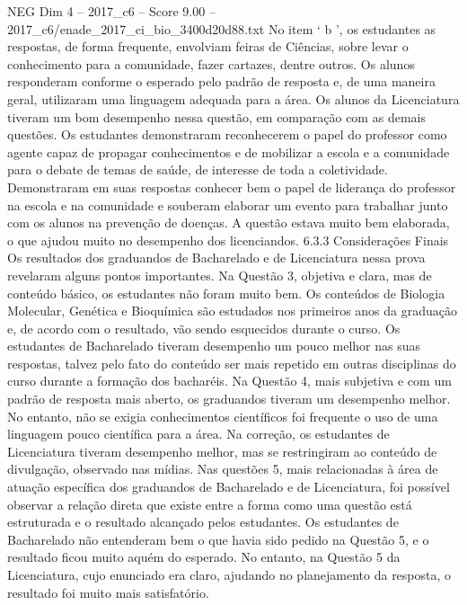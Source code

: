 \begin{textsample}{NEG Dim 4 – 2017\_c6 – Score 9.00 – 2017\_c6/enade\_2017\_ci\_bio\_3400d20d88.txt}
No item ‘ b ’, os estudantes as respostas, de forma frequente, envolviam feiras de Ciências, sobre levar o conhecimento para a comunidade, fazer cartazes, dentre outros.
Os alunos responderam conforme o esperado pelo padrão de resposta e, de uma maneira geral, utilizaram uma linguagem adequada para a área.
Os alunos da Licenciatura tiveram um bom desempenho nessa questão, em comparação com as demais questões.
Os estudantes demonstraram reconhecerem o papel do professor como agente capaz de propagar conhecimentos e de mobilizar a escola e a comunidade para o debate de temas de saúde, de interesse de toda a coletividade.
Demonstraram em suas respostas conhecer bem o papel de liderança do professor na escola e na comunidade e souberam elaborar um evento para trabalhar junto com os alunos na prevenção de doenças.
A questão estava muito bem elaborada, o que ajudou muito no desempenho dos licenciandos. 6.3.3 Considerações Finais Os resultados dos graduandos de Bacharelado e de Licenciatura nessa prova revelaram alguns pontos importantes.
Na Questão 3, objetiva e clara, mas de conteúdo básico, os estudantes não foram muito bem.
Os conteúdos de Biologia Molecular, Genética e Bioquímica são estudados nos primeiros anos da graduação e, de acordo com o resultado, vão sendo esquecidos durante o curso.
Os estudantes de Bacharelado tiveram desempenho um pouco melhor nas suas respostas, talvez pelo fato do conteúdo ser mais repetido em outras disciplinas do curso durante a formação dos bacharéis.
Na Questão 4, mais subjetiva e com um padrão de resposta mais aberto, os graduandos tiveram um desempenho melhor.
No entanto, não se exigia conhecimentos científicos foi frequente o uso de uma linguagem pouco científica para a área.
Na correção, os estudantes de Licenciatura tiveram desempenho melhor, mas se restringiram ao conteúdo de divulgação, observado nas mídias.
Nas questões 5, mais relacionadas à área de atuação específica dos graduandos de Bacharelado e de Licenciatura, foi possível observar a relação direta que existe entre a forma como uma questão está estruturada e o resultado alcançado pelos estudantes.
Os estudantes de Bacharelado não entenderam bem o que havia sido pedido na Questão 5, e o resultado ficou muito aquém do esperado.
No entanto, na Questão 5 da Licenciatura, cujo enunciado era claro, ajudando no planejamento da resposta, o resultado foi muito mais satisfatório.

\end{textsample}
